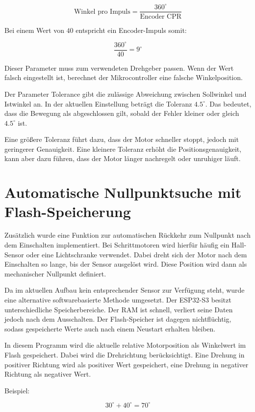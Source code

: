 \documentclass[a4paper,12pt]{article}
\begin{document}
\[
\text{Winkel pro Impuls} = \frac{360^\circ}{\text{Encoder CPR}}
\]

Bei einem Wert von \(40\) entspricht ein Encoder-Impuls somit:

\[
\frac{360^\circ}{40} = 9^\circ
\]

Dieser Parameter muss zum verwendeten Drehgeber passen. Wenn der Wert falsch eingestellt ist, berechnet der Mikrocontroller eine falsche Winkelposition.

Der Parameter Tolerance gibt die zulässige Abweichung zwischen Sollwinkel und Istwinkel an. 
In der aktuellen Einstellung beträgt die Toleranz \(4.5^\circ\). 
Das bedeutet, dass die Bewegung als abgeschlossen gilt, sobald der Fehler kleiner oder gleich \(4.5^\circ\) ist.

Eine größere Toleranz führt dazu, dass der Motor schneller stoppt, jedoch mit geringerer Genauigkeit. 
Eine kleinere Toleranz erhöht die Positionsgenauigkeit, kann aber dazu führen, dass der Motor länger nachregelt oder unruhiger läuft.




\section{Automatische Nullpunktsuche mit Flash-Speicherung}

Zusätzlich wurde eine Funktion zur automatischen Rückkehr zum Nullpunkt nach dem Einschalten implementiert. Bei Schrittmotoren wird hierfür häufig ein Hall-Sensor oder eine Lichtschranke verwendet. Dabei dreht sich der Motor nach dem Einschalten so lange, bis der Sensor ausgelöst wird. Diese Position wird dann als mechanischer Nullpunkt definiert.

Da im aktuellen Aufbau kein entsprechender Sensor zur Verfügung steht, wurde eine alternative softwarebasierte Methode umgesetzt. Der ESP32-S3 besitzt unterschiedliche Speicherbereiche. Der RAM ist schnell, verliert seine Daten jedoch nach dem Ausschalten. Der Flash-Speicher ist dagegen nichtflüchtig, sodass gespeicherte Werte auch nach einem Neustart erhalten bleiben.

In diesem Programm wird die aktuelle relative Motorposition als Winkelwert im Flash gespeichert. Dabei wird die Drehrichtung berücksichtigt. Eine Drehung in positiver Richtung wird als positiver Wert gespeichert, eine Drehung in negativer Richtung als negativer Wert.

Beispiel:

\[
30^\circ + 40^\circ = 70^\circ
\]
\end{document}

